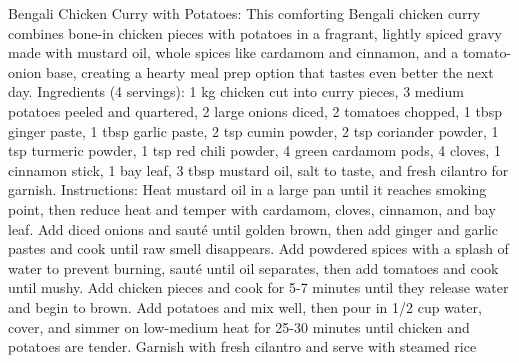 Bengali Chicken Curry with Potatoes: This comforting Bengali chicken curry combines bone-in chicken pieces with potatoes in a fragrant, lightly spiced gravy made with mustard oil, whole spices like cardamom and cinnamon, and a tomato-onion base, creating a hearty meal prep option that tastes even better the next day. Ingredients (4 servings): 1 kg chicken cut into curry pieces, 3 medium potatoes peeled and quartered, 2 large onions diced, 2 tomatoes chopped, 1 tbsp ginger paste, 1 tbsp garlic paste, 2 tsp cumin powder, 2 tsp coriander powder, 1 tsp turmeric powder, 1 tsp red chili powder, 4 green cardamom pods, 4 cloves, 1 cinnamon stick, 1 bay leaf, 3 tbsp mustard oil, salt to taste, and fresh cilantro for garnish. Instructions: Heat mustard oil in a large pan until it reaches smoking point, then reduce heat and temper with cardamom, cloves, cinnamon, and bay leaf. Add diced onions and sauté until golden brown, then add ginger and garlic pastes and cook until raw smell disappears. Add powdered spices with a splash of water to prevent burning, sauté until oil separates, then add tomatoes and cook until mushy. Add chicken pieces and cook for 5-7 minutes until they release water and begin to brown. Add potatoes and mix well, then pour in 1/2 cup water, cover, and simmer on low-medium heat for 25-30 minutes until chicken and potatoes are tender. Garnish with fresh cilantro and serve with steamed rice
\par

